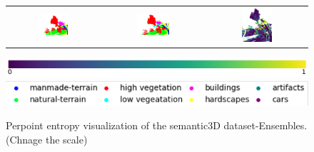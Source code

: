 \begin{figure}[h!]
\begin{tabular}{ccc}
            \includegraphics[width=0.33\textwidth, height=0.18\textheight]{images/seg_output/sem3d_seg_output/3_GT.pdf} &
            \includegraphics[width=0.33\textwidth, height=0.18\textheight]{images/seg_output/sem3d_seg_output/3_Pred.pdf}& 
            \includegraphics[width=0.33\textwidth, height=0.18\textheight]{images/seg_output/sem3d_seg_output/ent_de_3.pdf}\\
        \end{tabular}
        \includegraphics[scale=0.45]{images/prob_legend.pdf}
        \includegraphics[scale=0.65]{images/legend.png}
        \caption{Perpoint entropy visualization of the semantic3D dataset-Ensembles. (Chnage the scale)}
        \label{fig:de_sem3d_entmap}
    \end{figure}

